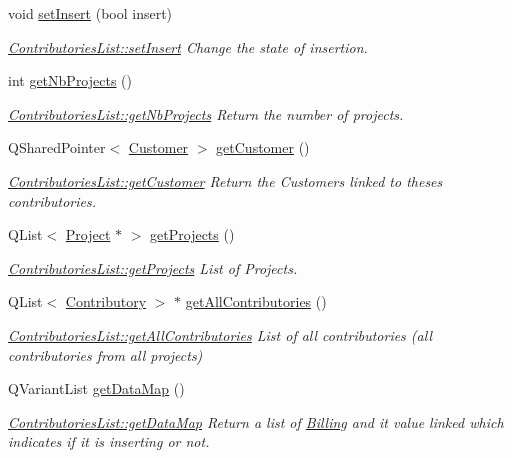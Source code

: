 \begin{DoxyCompactItemize}
void \hyperlink{classModels_1_1ContributoriesList_a5d34942a45954d98e53112e2523bee9b}{set\+Insert} (bool insert)
\begin{DoxyCompactList}\small\item\em \hyperlink{classModels_1_1ContributoriesList_a5d34942a45954d98e53112e2523bee9b}{Contributories\+List\+::set\+Insert} Change the state of insertion. \end{DoxyCompactList}\item 
int \hyperlink{classModels_1_1ContributoriesList_a026202989560ff9d462d6104b3788657}{get\+Nb\+Projects} ()
\begin{DoxyCompactList}\small\item\em \hyperlink{classModels_1_1ContributoriesList_a026202989560ff9d462d6104b3788657}{Contributories\+List\+::get\+Nb\+Projects} Return the number of projects. \end{DoxyCompactList}\item 
Q\+Shared\+Pointer$<$ \hyperlink{classModels_1_1Customer}{Customer} $>$ \hyperlink{classModels_1_1ContributoriesList_a760097b1c0d7822cfd3d4796d553fae9}{get\+Customer} ()
\begin{DoxyCompactList}\small\item\em \hyperlink{classModels_1_1ContributoriesList_a760097b1c0d7822cfd3d4796d553fae9}{Contributories\+List\+::get\+Customer} Return the Customers linked to theses contributories. \end{DoxyCompactList}\item 
Q\+List$<$ \hyperlink{classModels_1_1Project}{Project} $\ast$ $>$ \hyperlink{classModels_1_1ContributoriesList_a4d52a35870cd9257ee3b5db75bd8ff25}{get\+Projects} ()
\begin{DoxyCompactList}\small\item\em \hyperlink{classModels_1_1ContributoriesList_a4d52a35870cd9257ee3b5db75bd8ff25}{Contributories\+List\+::get\+Projects} List of Projects. \end{DoxyCompactList}\item 
Q\+List$<$ \hyperlink{classModels_1_1Contributory}{Contributory} $>$ $\ast$ \hyperlink{classModels_1_1ContributoriesList_a629a25a7958dba28ec37c8a3709cdf2f}{get\+All\+Contributories} ()
\begin{DoxyCompactList}\small\item\em \hyperlink{classModels_1_1ContributoriesList_a629a25a7958dba28ec37c8a3709cdf2f}{Contributories\+List\+::get\+All\+Contributories} List of all contributories (all contributories from all projects) \end{DoxyCompactList}\item 
Q\+Variant\+List \hyperlink{classModels_1_1ContributoriesList_af063322348b0f02d0c7159bd7413a836}{get\+Data\+Map} ()
\begin{DoxyCompactList}\small\item\em \hyperlink{classModels_1_1ContributoriesList_af063322348b0f02d0c7159bd7413a836}{Contributories\+List\+::get\+Data\+Map} Return a list of \hyperlink{classModels_1_1Billing}{Billing} and it value linked which indicates if it is inserting or not. \end{DoxyCompactList}\end{DoxyCompactItemize}


